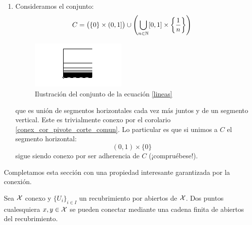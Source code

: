 \begin{exa}[Miscelánea]
\begin{enumerate}
		\item Consideramos el conjunto:
		\begin{equation}\label{lineas}C = \big(\{0\}\times (0,1]\big) \cup \left(\bigcup_{n\in\mathbb{N}} [0,1]\times\left\{\frac{1}{n}\right\}\right) \end{equation}
		\begin{figure}[H]
			\centering
			\includegraphics[scale = 0.2]{img/lineas}
			\caption{Ilustración del conjunto de la ecuación \eqref{lineas}}
		\end{figure}
		que es unión de segmentos horizontales cada vez más juntos y de un segmento vertical. Este es trivialmente conexo por el corolario \ref{conex_cor_pivote_corte_comun}. Lo particular es que si unimos a $C$ el segmento horizontal:
		\[(0,1)\times\{0\}\]
		sigue siendo conexo por ser adherencia de $C$ (¡compruébese!). 
\qedhere
	\end{enumerate}
\end{exa}

Completamos esta sección con una propiedad interesante garantizada por la conexión.

\begin{lem}[Cadena]
	Sea $\mathcal{X}$ conexo y $\{U_i\}_{i\in I}$ un recubrimiento por abiertos de $\mathcal{X}$. Dos puntos cualesquiera $x,y\in\mathcal{X}$ se pueden conectar mediante una cadena finita de abiertos del recubrimiento.
\end{lem}

